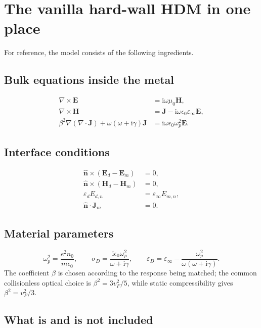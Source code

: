 \documentclass[11pt,a4paper]{article}
\newcommand{\E}{\mathbf E}
\newcommand{\Hfield}{\mathbf H}
\newcommand{\J}{\mathbf J}
\newcommand{\nvec}{\hat{\mathbf n}}
\newcommand{\ii}{\mathrm i}
\newcommand{\eps}{\varepsilon}
\newcommand{\epsinf}{\varepsilon_\infty}
\newcommand{\epsd}{\varepsilon_d}
\newcommand{\omegap}{\omega_p}
\newcommand{\vF}{v_F}
\begin{document}
\section{The vanilla hard-wall HDM in one place}

For reference, the model consists of the following ingredients.

\subsection*{Bulk equations inside the metal}
\begin{align}
    \nabla\!\times\!\E&=\ii\omega\mu_0\Hfield,\\
    \nabla\!\times\!\Hfield
    &=\J-\ii\omega\epsilon_0\epsinf\E,\\
    \beta^2\nabla(\nabla\!\cdot\!\J)
    +\omega(\omega+\ii\gamma)\J
    &=\ii\omega\epsilon_0\omegap^2\E.
    \label{eq:model-bulk-summary}
\end{align}

\subsection*{Interface conditions}
\begin{align}
    \nvec\times(\E_d-\E_m)&=0,\\
    \nvec\times(\Hfield_d-\Hfield_m)&=0,\\
    \epsd E_{d,n}&=\epsinf E_{m,n},\\
    \nvec\!\cdot\!\J_m&=0.
    \label{eq:model-bc-summary}
\end{align}

\subsection*{Material parameters}
\begin{equation}
    \omegap^2=\frac{e^2n_0}{m\epsilon_0},
    \qquad
    \sigma_D=\frac{\ii\epsilon_0\omegap^2}{\omega+\ii\gamma},
    \qquad
    \eps_D=\epsinf-
    \frac{\omegap^2}{\omega(\omega+\ii\gamma)}.
    \label{eq:model-parameters-summary}
\end{equation}
The coefficient \(\beta\) is chosen according to the response being matched;
the common collisionless optical choice is
\(\beta^2=3\vF^2/5\), while static compressibility gives
\(\beta^2=\vF^2/3\).

\subsection*{What is and is not included}
\end{document}
